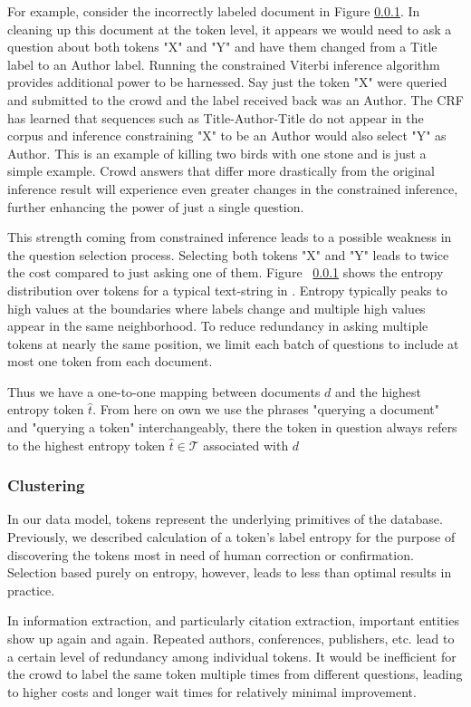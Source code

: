 For example, consider the incorrectly labeled document in Figure \ref{}.  In cleaning up this document at the token level, it appears we would need to ask a question about both tokens "X" and "Y" and have them changed from a Title label to an Author label.  Running the constrained Viterbi inference algorithm provides additional power to be harnessed.  Say just the token "X" were queried and submitted to the crowd and the label received back was an Author.  The CRF has learned that sequences such as Title-Author-Title do not appear in the corpus and inference constraining "X" to be an Author would also select "Y" as Author.  This is an example of killing two birds with one stone and is just a simple example.  Crowd answers that differ more drastically from the original inference result will experience even greater changes in the constrained inference, further enhancing the power of just a single question. 

This strength coming from constrained inference leads to a possible weakness in the question selection process.  Selecting both tokens "X" and "Y" leads to twice the cost compared to just asking one of them.  Figure ~\ref{} shows the entropy distribution over tokens for a typical text-string in \sysName .  Entropy typically peaks to high values at the boundaries where labels change and multiple high values appear in the same neighborhood.  To reduce redundancy in asking multiple tokens at nearly the same position, we limit each batch of questions to include at most one token from each document.

Thus we have a one-to-one mapping between documents $d$ and the highest entropy token $\hat{t}$.  From here on own we use the phrases "querying a document" and "querying a token" interchangeably, there the token in question always refers to the highest entropy token $\hat{t}\in\mathcal{T}$ associated with $d$

\subsubsection{Clustering}

In our data model, tokens represent the underlying primitives of the database.  Previously, we described calculation of a token's label entropy for the purpose of discovering the tokens most in need of human correction or confirmation.  Selection based purely on entropy, however, leads to less than optimal results in practice.

In information extraction, and particularly citation extraction, important entities show up again and again.  Repeated authors, conferences, publishers, etc. lead to a certain level of redundancy among individual tokens.  It would be inefficient for the crowd to label the same token multiple times from different questions, leading to higher costs and longer wait times for relatively minimal improvement.

